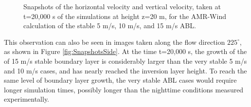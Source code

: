 \begin{figure}[hbt!]
  \caption{ \label{fig:SnapshotsZ20} Snapshots of the horizontal
    velocity and vertical velocity, taken at t=20,000 s of the
    simulations at height z=20 m, for the AMR-Wind calculation of the
    stable 5 m/s, 10 m/s, and 15 m/s ABL. }
\end{figure}

This observation can also be seen in images taken along the flow
direction $225^\circ$, as shown in Figure
\ref{fig:SnapshotsSide}.  At the time t=20,000 s, the growth of the
of 15 m/s stable boundary layer is considerably larger than the very
stable 5 m/s and 10 m/s cases, and has nearly reached the inversion
layer height.  To reach the same level of boundary layer growth, the
very stable ABL cases would require longer simulation times, possibly
longer than the nighttime conditions measured experimentally.

